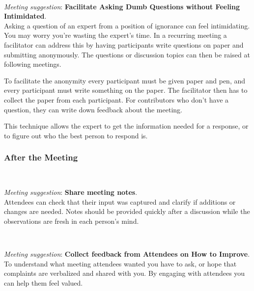 \ \\
\begin{samepage}
\textit{Meeting suggestion}: \textbf{Facilitate Asking Dumb Questions without Feeling Intimidated}.\\
\nopagebreak %
Asking a question of an expert from a position of ignorance can feel intimidating. You may worry you're wasting the expert's time. In a recurring meeting a facilitator can address this by having participants write questions on paper and submitting anonymously. The questions or discussion topics can then be raised at following meetings. 
\end{samepage}

To facilitate the anonymity every participant must be given paper and pen, and every participant must write something on the paper. The facilitator then has to collect the paper from each participant. For contributors who don't have a question, they can write down feedback about the meeting. 

This technique allows the expert to get the information needed for a response, or to figure out who the best person to respond is. 

\subsubsection*{After the Meeting}

\ \\
\begin{samepage}
\textit{Meeting suggestion}: \textbf{Share meeting notes}.\\
Attendees can check that their input was captured and clarify if additions or changes are needed. Notes should be provided quickly after a discussion while the observations are fresh in each person's mind.
\end{samepage}

\ \\
\begin{samepage}
\textit{Meeting suggestion}: \textbf{Collect feedback from Attendees on How to Improve}.\\
To understand what meeting attendees wanted you have to ask, or hope that complaints are verbalized and shared with you. By engaging with attendees you can help them feel valued.
\end{samepage}
